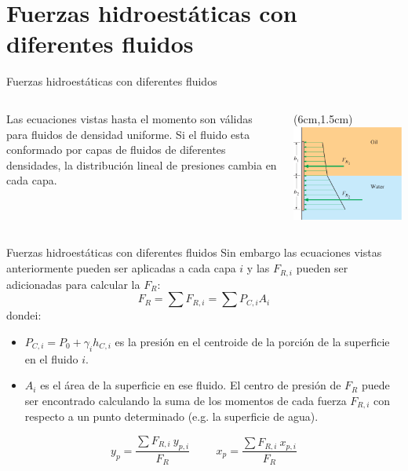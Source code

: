 \documentclass [xcolor=svgnames, t] {beamer}
\begin{document}
\section{Fuerzas hidroest\'aticas con diferentes fluidos}
\begin{frame}{Fuerzas hidroest\'aticas con diferentes fluidos}
\begin{columns}
Las ecuaciones  vistas hasta el momento son v\'alidas para fluidos de densidad uniforme. Si el fluido esta conformado por capas de fluidos de diferentes densidades, la distribuci\'on lineal de presiones cambia en cada capa. 
\begin{textblock*}{6cm}(6cm,1.5cm) %
\includegraphics[width=\textwidth]{mden}
\end{textblock*}
\end{columns}
\end{frame}

\begin{frame}{Fuerzas hidroest\'aticas con diferentes fluidos}
Sin embargo las ecuaciones vistas anteriormente pueden ser aplicadas a cada capa $i$ y las $F_{R,i}$ pueden ser adicionadas para calcular la $F_R$:
$$
F_R = \sum F_{R,i} = \sum P_{C,i}A_i
$$
dondei: 
\begin{itemize}
\item $P_{C,i} =  P_0 + \gamma_i h_{C,i}$ es la presi\'on en el centroide de la porci\'on de la superficie en el fluido $i$.
\item $A_i$ es el \'area de la superficie en ese fluido. El centro de presi\'on de $F_R$ puede ser encontrado calculando la suma de los momentos de cada fuerza $F_{R,i}$ con respecto a un punto determinado (e.g. la superficie de agua).
\end{itemize}
$$
y_p = \frac{\sum F_{R,i}\ y_{p,i}}{F_R} \hspace{1cm} x_p = \frac{\sum F_{R,i}\ x_{p,i}}{F_R}
$$
\end{frame}
\end{document}
